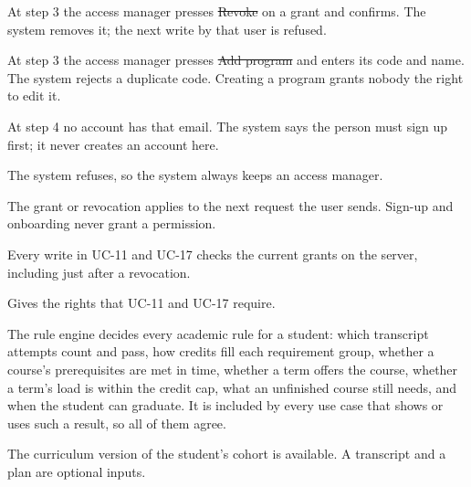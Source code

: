 \begin{altflows}
  \item[A1. Revoke.] At step 3 the access manager presses \st{Revoke} on a grant and confirms. The system removes it; the
        next write by that user is refused.
  \item[A2. Add a program.] At step 3 the access manager presses \st{Add program} and enters its code and name. The system
        rejects a duplicate code. Creating a program grants nobody the right to edit it.
  \item[A3. Unknown user.] At step 4 no account has that email. The system says the person must sign up first; it never
        creates an account here.
  \item[A4. Revoke your own last access-manager grant.] The system refuses, so the system always keeps an access manager.
\end{altflows}

The grant or revocation applies to the next request the user sends. Sign-up and onboarding never grant a permission.

Every write in UC-11 and UC-17 checks the current grants on the server, including just after a revocation.

Gives the rights that UC-11 and UC-17 require.


The rule engine decides every academic rule for a student: which transcript attempts count and pass, how credits fill each
requirement group, whether a course's prerequisites are met in time, whether a term offers the course, whether a term's load
is within the credit cap, what an unfinished course still needs, and when the student can graduate. It is included by every
use case that shows or uses such a result, so all of them agree.

The curriculum version of the student's cohort is available. A transcript and a plan are optional inputs.

